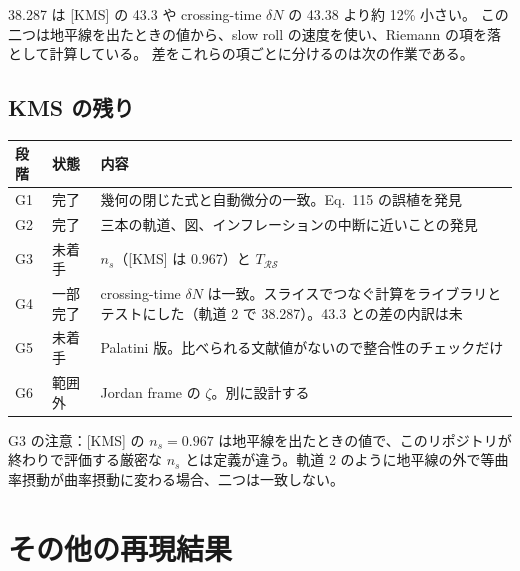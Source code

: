 \documentclass[a4paper,11pt]{ltjsarticle}
\begin{document}
38.287 は [KMS] の 43.3 や crossing-time $\delta N$ の 43.38 より約 12\% 小さい。
この二つは地平線を出たときの値から、slow roll の速度を使い、Riemann の項を落として計算している。
差をこれらの項ごとに分けるのは次の作業である。

\subsection{KMS の残り}

\begin{center}
\begin{tabular}{llp{10.5cm}}
\toprule
段階 & 状態 & 内容 \\
\midrule
G1 & 完了 & 幾何の閉じた式と自動微分の一致。Eq.~115 の誤植を発見 \\
G2 & 完了 & 三本の軌道、図、インフレーションの中断に近いことの発見 \\
G3 & 未着手 & $n_s$（[KMS] は 0.967）と $T_{\mathcal{RS}}$ \\
G4 & 一部完了 & crossing-time $\delta N$ は一致。スライスでつなぐ計算をライブラリとテストにした（軌道 2 で 38.287）。43.3 との差の内訳は未 \\
G5 & 未着手 & Palatini 版。比べられる文献値がないので整合性のチェックだけ \\
G6 & 範囲外 & Jordan frame の $\zeta$。別に設計する \\
\bottomrule
\end{tabular}
\end{center}
G3 の注意：[KMS] の $n_s=0.967$ は地平線を出たときの値で、このリポジトリが終わりで評価する厳密な $n_s$ とは定義が違う。軌道 2 のように地平線の外で等曲率摂動が曲率摂動に変わる場合、二つは一致しない。

\section{その他の再現結果}
\end{document}
